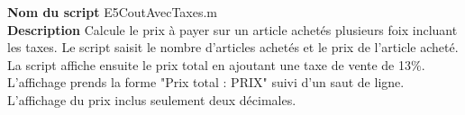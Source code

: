 \textbf{Nom du script}
E5CoutAvecTaxes.m\\
\textbf{Description}
Calcule le prix à payer sur un article achetés plusieurs foix incluant les taxes. Le script saisit le nombre d'articles achetés et le prix de l'article acheté. La script affiche ensuite le prix total en ajoutant une taxe de vente de 13\%. L'affichage prends la forme "Prix total : PRIX" suivi d'un saut de ligne. L'affichage du prix inclus seulement deux décimales.